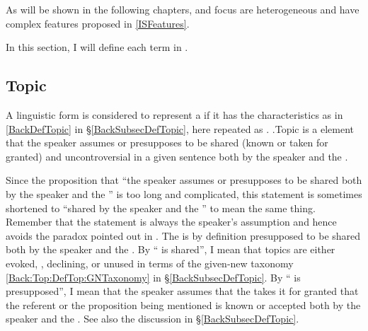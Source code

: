 As will be shown in the following chapters,
 and focus are heterogeneous
and have complex features proposed in \ref{ISFeatures}.

In this section,
I will define each term in \Last.

\subsection{Topic}\label{FrameworkTopic}

A linguistic form is considered to represent a 
if it has the characteristics as in \ref{BackDefTopic} in \S \ref{BackSubsecDefTopic},
here repeated as \Next.
%
\ex.\label{FrameworkTopicDef}Topic is a  element that the speaker assumes or presupposes to be shared (known or taken for granted) and uncontroversial in a given sentence both by the speaker and the .

%
Since the proposition that ``the speaker assumes or presupposes to be shared both by the speaker and the '' is too long and complicated,
this statement is sometimes shortened to ``shared by the speaker and the '' to mean the same thing.
Remember that the statement is always the speaker's assumption
and hence avoids the paradox pointed out in .
The  is by definition presupposed to be shared both by the speaker and the .
By `` is shared'',
I mean that topics are either evoked, , declining, or unused
in terms of the given-new taxonomy \ref{Back:Top:DefTop:GNTaxonomy} in \S \ref{BackSubsecDefTopic}.
By `` is presupposed'',
I mean that the speaker assumes that the  takes it for granted that the referent or the proposition being mentioned is known or accepted both by the speaker and the .
See also the discussion in \S \ref{BackSubsecDefTopic}.

